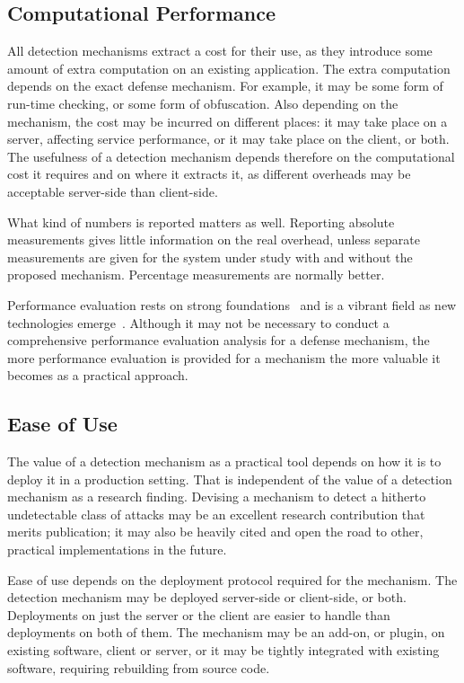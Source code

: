 \documentclass[conference]{IEEEtran}
\begin{document}
\subsection{Computational Performance}

All detection mechanisms extract a cost for their use, as they
introduce some amount of extra computation on an existing application.
The extra computation depends on the exact defense mechanism. For
example, it may be some form of run-time checking, or some form of
obfuscation. Also depending on the mechanism, the cost may be incurred
on different places: it may take place on a server, affecting service
performance, or it may take place on the client, or both. The
usefulness of a detection mechanism depends therefore on the
computational cost it requires and on where it extracts it, as
different overheads may be acceptable server-side than client-side.

What kind of numbers is reported matters as well. Reporting absolute
measurements gives little information on the real overhead, unless
separate measurements are given for the system under study with and
without the proposed mechanism. Percentage measurements are normally
better. 

Performance evaluation rests on strong foundations~\cite{jain1991} and
is a vibrant field as new technologies emerge~\cite{gregg2014}.
Although it may not be necessary to conduct a comprehensive
performance evaluation analysis for a defense mechanism, the more
performance evaluation is provided for a mechanism the more valuable
it becomes as a practical approach.

\subsection{Ease of Use}
\label{sec:deployment}

The value of a detection mechanism as a practical tool depends on how
it is to deploy it in a production setting. That is independent of the
value of a detection mechanism as a research finding. Devising a
mechanism to detect a hitherto undetectable class of attacks may be an
excellent research contribution that merits publication; it may also
be heavily cited and open the road to other, practical
implementations in the future. 

Ease of use depends on the deployment protocol required for the
mechanism. The detection mechanism may be deployed server-side or
client-side, or both. Deployments on just the server or the client are
easier to handle than deployments on both of them. The mechanism may
be an add-on, or plugin, on existing software, client or server, or it
may be tightly integrated with existing software, requiring rebuilding
from source code.
\end{document}

